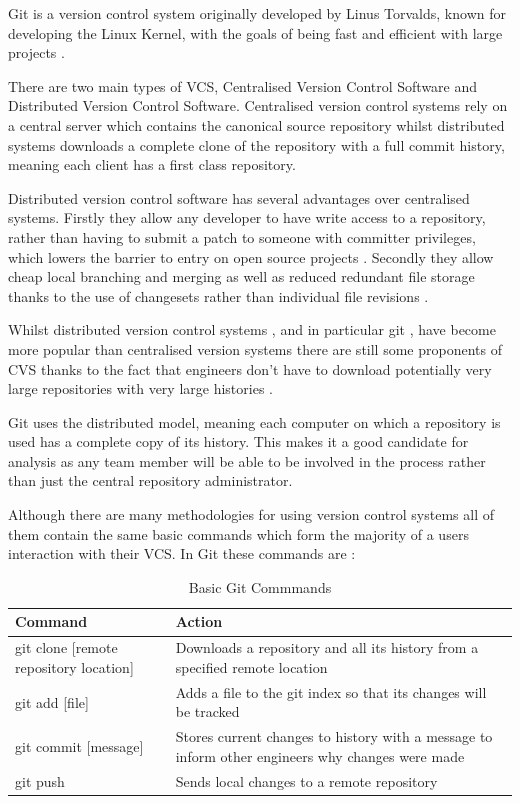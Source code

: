 \documentclass[11pt]{book}
\begin{document}
Git is a version control system originally developed by Linus Torvalds, known for developing the Linux Kernel, with the goals of being fast and efficient with large projects \cite{progit}.

There are two main types of VCS, Centralised Version Control Software and Distributed Version Control Software. Centralised version control systems rely on a central server which contains the canonical source repository whilst distributed systems downloads a complete clone of the repository with a full commit history, meaning each client has a first class repository\cite{whydistributed}.

Distributed version control software has several advantages over centralised systems. Firstly they allow any developer to have write access to a repository, rather than having to submit a patch to someone with committer privileges, which lowers the barrier to entry on open source projects \cite{distributedimpactoss}. Secondly they allow cheap local branching and merging as well as reduced redundant file storage thanks to the use of changesets rather than individual file revisions \cite{distributedimpactoss}. 

Whilst distributed version control systems \cite{whydistributed}, and in particular git \cite{gitpopularity}, have become more popular than centralised version systems there are still some proponents of CVS thanks to the fact that engineers don't have to download potentially very large repositories with very large histories \cite{cvsvsvcs}.

Git uses the distributed model, meaning each computer on which a repository is used has a complete copy of its history. This makes it a good candidate for analysis as any team member will be able to be involved in the process rather than just the central repository administrator.

Although there are many methodologies for using version control systems all of them contain the same basic commands which form the majority of a users interaction with their VCS. In Git these commands are \cite{gitrefbasic}: 

\begin{table}[h]
\centering
\begin{tabular}{| l | p{9cm} |}
\hline
\textbf{Command} & \textbf{Action} \\ \hline
git clone [remote repository location] & Downloads a repository and all its history from a specified remote location \\ \hline
git add [file] & Adds a file to the git index so that its changes will be tracked \\ \hline
git commit [message] & Stores current changes to history with a message to inform other engineers why changes were made \\ \hline
git push & Sends local changes to a remote repository \\ \hline
\end{tabular}
\caption{Basic Git Commmands}
\label{tab:basic-git-commands}
\end{table}
\end{document}
